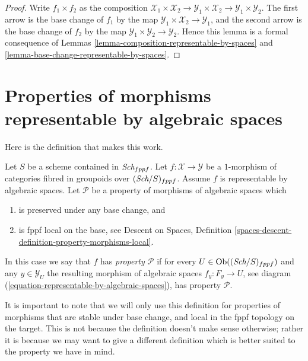\begin{proof}
Write $f_1 \times f_2$ as the composition
$\mathcal{X}_1 \times \mathcal{X}_2 \to
\mathcal{Y}_1 \times \mathcal{X}_2 \to
\mathcal{Y}_1 \times \mathcal{Y}_2$.
The first arrow is the base change of $f_1$ by the map
$\mathcal{Y}_1 \times \mathcal{X}_2 \to \mathcal{Y}_1$, and the second arrow
is the base change of $f_2$ by the map
$\mathcal{Y}_1 \times \mathcal{Y}_2 \to \mathcal{Y}_2$.
Hence this lemma is a formal
consequence of Lemmas \ref{lemma-composition-representable-by-spaces}
and \ref{lemma-base-change-representable-by-spaces}.
\end{proof}









\section{Properties of morphisms representable by algebraic spaces}
\label{section-representable-properties}

\noindent
Here is the definition that makes this work.

\begin{definition}
\label{definition-relative-representable-property}
Let $S$ be a scheme contained in $\textit{Sch}_{fppf}$.
Let $f : \mathcal{X} \to \mathcal{Y}$ be a $1$-morphism
of categories fibred in groupoids over $(\textit{Sch}/S)_{fppf}$.
Assume $f$ is representable by algebraic spaces.
Let $\mathcal{P}$ be a property of morphisms of algebraic spaces which
\begin{enumerate}
\item is preserved under any base change, and
\item is fppf local on the base, see
Descent on Spaces,
Definition \ref{spaces-descent-definition-property-morphisms-local}.
\end{enumerate}
In this case we say that $f$ has {\it property $\mathcal{P}$} if for every
$U \in \text{Ob}((\textit{Sch}/S)_{fppf})$ and
any $y \in \mathcal{Y}_U$ the resulting morphism of algebraic spaces
$f_y : F_y \to U$, see
diagram (\ref{equation-representable-by-algebraic-spaces}),
has property $\mathcal{P}$.
\end{definition}

\noindent
It is important to note that we will only use this definition for
properties of morphisms that are stable under base change, and
local in the fppf topology on the target. This is
not because the definition doesn't make sense otherwise; rather it
is because we may want to give a different definition which is
better suited to the property we have in mind.

